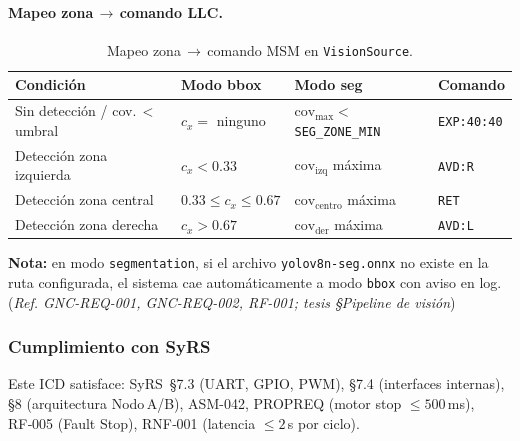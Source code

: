 \paragraph{Mapeo zona\,$\rightarrow$\,comando LLC.}
\begin{table}[H]
\centering
\small
\renewcommand{\arraystretch}{1.3}
\begin{tabular}{p{4.2cm} p{2.8cm} p{2.8cm} l}
\toprule
\textbf{Condición} & \textbf{Modo bbox} & \textbf{Modo seg} & \textbf{Comando} \\
\midrule
Sin detección / cov.\,$<$\,umbral & $c_x =$ ninguno & $\text{cov}_\text{max} <$ \texttt{SEG\_ZONE\_MIN} & \texttt{EXP:40:40} \\
Detección zona izquierda          & $c_x < 0.33$    & $\text{cov}_\text{izq}$ máxima              & \texttt{AVD:R} \\
Detección zona central            & $0.33 \le c_x \le 0.67$ & $\text{cov}_\text{centro}$ máxima  & \texttt{RET} \\
Detección zona derecha            & $c_x > 0.67$    & $\text{cov}_\text{der}$ máxima              & \texttt{AVD:L} \\
\bottomrule
\end{tabular}
\caption{Mapeo zona\,$\rightarrow$\,comando MSM en \texttt{VisionSource}.}
\label{tab:icd_llc_vision_cmd}
\end{table}

\noindent\textbf{Nota:} en modo \texttt{segmentation}, si el archivo
\texttt{yolov8n-seg.onnx} no existe en la ruta configurada, el sistema
cae automáticamente a modo \texttt{bbox} con aviso en log.
(\emph{Ref. GNC-REQ-001, GNC-REQ-002, RF-001; tesis §Pipeline de visión})

\subsubsection{Cumplimiento con SyRS}

Este ICD satisface:
SyRS~§7.3 (UART, GPIO, PWM), §7.4 (interfaces internas),
§8 (arquitectura Nodo\,A/B), ASM-042,
PROP\-REQ (motor stop $\leq 500$\,ms),
RF‑005 (Fault Stop), RNF‑001 (latencia $\leq 2$\,s por ciclo).%
